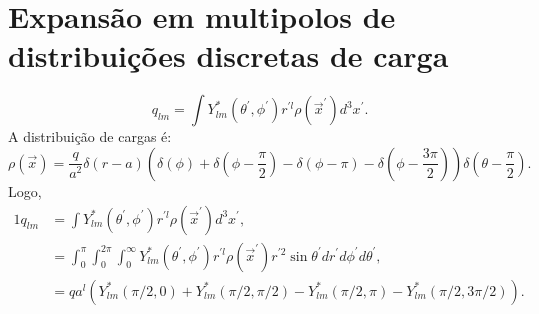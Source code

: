 \documentclass{article}
\def\Xint#1{\mathchoice
   {\XXint\displaystyle\textstyle{#1}}%
   {\XXint\textstyle\scriptstyle{#1}}%
   {\XXint\scriptstyle\scriptscriptstyle{#1}}%
   {\XXint\scriptscriptstyle\scriptscriptstyle{#1}}%
   \!\int}
\def\XXint#1#2#3{{\setbox0=\hbox{$#1{#2#3}{\int}$}
     \vcenter{\hbox{$#2#3$}}\kern-.5\wd0}}
\def\dashint{\Xint-}
\begin{document}
% 
% 
\section{Expansão em multipolos de distribuições discretas de carga}
\begin{equation}
 q_{lm} = \int Y^{*}_{lm}(\theta^{\prime},\phi^{\prime})r^{\prime l}\rho(\vec{x}^{\prime}) d^{3}x^{\prime}\mathrm{.}
\end{equation}
A distribuição de cargas é:
\begin{equation}
 \rho(\vec{x}) = \frac{q}{a^2}\delta(r - a)\left( \delta(\phi)+\delta\left(\phi-\frac{\pi}{2}\right)-\delta(\phi-\pi)-\delta\left(\phi - \frac{3\pi}{2}\right) \right)
 \delta\left(\theta - \frac{\pi}{2}\right)\mathrm{.}
\end{equation}
Logo,
\begin{alignat}{1}
 q_{lm} &= \int Y^{*}_{lm}(\theta^{\prime},\phi^{\prime})r^{\prime l}\rho(\vec{x}^{\prime}) d^{3}x^{\prime}\mathrm{,}\\
 &= \int_{0}^{\pi} \int_{0}^{2\pi} \int_{0}^{\infty} Y^{*}_{lm}(\theta^{\prime},\phi^{\prime})r^{\prime l}\rho(\vec{x}^{\prime})
 r^{\prime 2}\sin{\theta^{\prime}} dr^{\prime} d\phi^{\prime} d\theta^{\prime} \mathrm{,}\\
 &= q a^{l} \left(Y^{*}_{lm}(\pi \slash 2,0) + Y^{*}_{lm}(\pi \slash 2,\pi \slash 2)-Y^{*}_{lm}(\pi \slash 2,\pi) -
 Y^{*}_{lm}(\pi \slash 2,3\pi \slash 2) \right)\mathrm{.}
\end{alignat}
\end{document}
